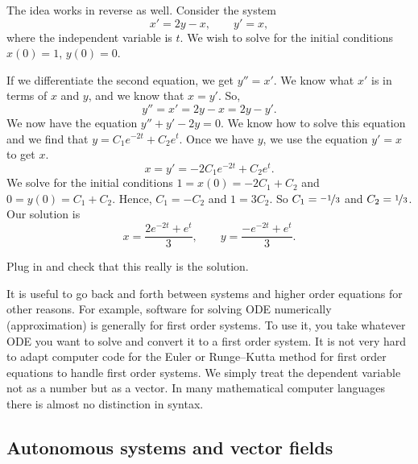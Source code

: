\begin{example}
The idea works in reverse as well.  Consider 
the system
\begin{equation*}
x' = 2y-x , \qquad
y' = x, 
\end{equation*}
where the independent variable is $t$.  We wish to solve for the initial
conditions $x(0) = 1$, $y(0) =0$.

If we differentiate the second equation, we get
$y''=x'$.  We know what $x'$ is in terms of $x$ and $y$, and
we know that $x=y'$.  So,
\begin{equation*}
y'' = x' = 2y-x = 2y-y' .
\end{equation*}
We now have the equation $y''+y'-2y = 0$.  We know how to solve this
equation and we find that $y = C_1 e^{-2t} + C_2 e^t$.  Once we have $y$,
we use the equation $y' = x$ to get $x$.
\begin{equation*}
x = y' = -2 C_1 e^{-2t} + C_2 e^t .
\end{equation*}
We solve for the initial conditions $1 = x(0) = -2 C_1 + C_2$
and $0 = y(0) = C_1 + C_2$.  Hence, $C_1 = -C_2$ and $1 = 3C_2$.
So $C_1 = \nicefrac{-1}{3}$ and $C_2 = \nicefrac{1}{3}$.  Our solution is
\begin{equation*}
x = \frac{2e^{-2t} + e^t}{3} ,\qquad
y = \frac{-e^{-2t} + e^t}{3} .
\end{equation*}
\end{example}

\begin{exercise}
Plug in and check that this really is the solution.
\end{exercise}

It is useful to go back and forth between systems and higher order equations
for other reasons.  For example, software for solving ODE numerically
(approximation) is generally for first order systems.  To use it,
you take whatever ODE you want to solve and convert it to a first
order system.  It is not very hard
to adapt computer code for the Euler or Runge--Kutta method for first order equations to
handle first
order systems.  We simply treat the dependent variable not as
a number but as a vector.  In many mathematical computer languages there is
almost no distinction in syntax.


\subsection{Autonomous systems and vector fields}

